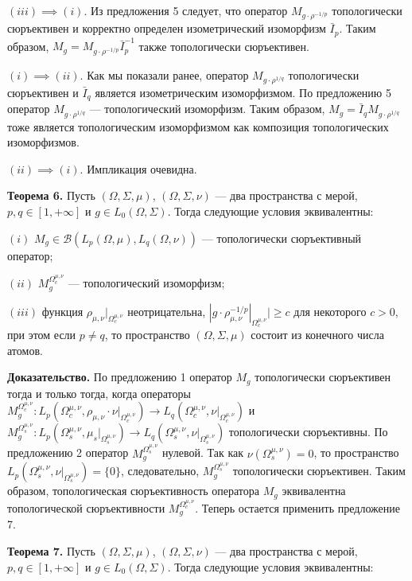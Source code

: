 \documentclass[11pt,twoside]{article}
\begin{document}
$(iii)$$\implies$$ (i)$. Из предложения 5 следует, что оператор
$M_{g\cdot\rho^{-1/p}}$ топологически сюръективен и корректно определен
изометрический изоморфизм $\bar{I}_p$. Таким образом, $M_g=
M_{g\cdot\rho^{-1/p}}\bar{I}_p^{-1}$ также топологически сюръективен.

$(i)$$\implies$$ (ii)$. Как мы показали ранее, оператор
$M_{g\cdot\rho^{1/q}}$ топологически сюръективен и $\bar{I}_q$ является
изометрическим изоморфизмом. По предложению 5 оператор
$M_{g\cdot\rho^{1/q}}$ --- топологический изоморфизм. Таким образом,
$M_g=\bar{I}_q M_{g\cdot\rho^{1/q}}$ тоже является топологическим
изоморфизмом как композиция топологических изоморфизмов.

$(ii)$$\implies$$ (i)$. Импликация очевидна.


\textbf{Теорема 6.} Пусть $(\Omega,\Sigma,\mu)$, $(\Omega,\Sigma,\nu)$
--- два пространства с мерой, $p,q\in[1,+\infty]$ и $g\in
L_0(\Omega,\Sigma)$. Тогда следующие условия эквивалентны:

$(i)$ $M_g\in\mathcal{B}(L_p(\Omega,\mu), L_q(\Omega,\nu))$ ---
топологически сюръективный оператор;

$(ii)$ $M_g^{\Omega_c^{\mu,\nu}}$ --- топологический изоморфизм;

$(iii)$ функция $\rho_{\mu,\nu}|_{\Omega_c^{\mu,\nu}}$ неотрицательна,
$|g\cdot\rho_{\mu,\nu}^{-1/p}|_{\Omega_c^{\mu,\nu}}|\geq c$ для некоторого
$c>0$, при этом если $p\neq q$, то пространство $(\Omega,\Sigma,\mu)$
состоит из конечного числа атомов.

\textbf{Доказательство.} По предложению 1 оператор $M_g$ топологически
сюръективен тогда и только тогда, когда операторы
$M_g^{\Omega_c^{\mu,\nu}}:
L_p(\Omega_c^{\mu,\nu},\rho_{\mu,\nu}\cdot\nu|_{\Omega_c^{\mu,\nu}})
\to
L_q(\Omega_c^{\mu,\nu},\nu|_{\Omega_c^{\mu,\nu}})$ и
$M_g^{\Omega_s^{\mu,\nu}}:
L_p(\Omega_s^{\mu,\nu},\mu_s|_{\Omega_s^{\mu,\nu}})
\to
L_q(\Omega_s^{\mu,\nu},\nu|_{\Omega_s^{\mu,\nu}})$ топологически
сюръективны. По предложению 2 оператор $M_g^{\Omega_s^{\mu,\nu}}$
нулевой. Так как $\nu(\Omega_s^{\mu,\nu})=0$, то пространство
$L_p(\Omega_s^{\mu,\nu},\nu|_{\Omega_s^{\mu,\nu}})=\{0\}$,
следовательно, $M_g^{\Omega_s^{\mu,\nu}}$ топологически сюръективен.
Таким образом, топологическая сюръективность оператора $M_g$
эквивалентна топологической сюръективности  $M_g^{\Omega_c^{\mu,\nu}}$.
Теперь остается применить предложение 7.


\textbf{Теорема 7.} Пусть $(\Omega,\Sigma,\mu)$, $(\Omega,\Sigma,\nu)$
--- два пространства с мерой, $p,q\in[1,+\infty]$ и $g\in
L_0(\Omega,\Sigma)$. Тогда следующие условия эквивалентны:
\end{document}
